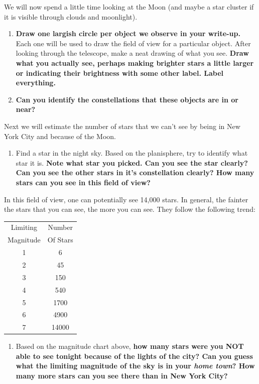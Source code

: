 \documentclass[11pt]{article}
\begin{document}
\medskip \noindent
We will now spend a little time looking at the Moon (and maybe a star cluster if it is visible through clouds and moonlight).  
\begin{enumerate}[resume]
    \item \textbf{Draw one largish circle per object we observe in your write-up.}  Each one will be used to draw the field of view for a particular object. After looking through the telescope, make a neat drawing of what you see. \textbf{Draw what you actually see, perhaps making brighter stars a little larger or indicating their brightness with some other label. Label everything.}
    
    \item \textbf{Can you identify the constellations that these objects are in or near?}
\end{enumerate} 

\medskip \noindent
Next we will estimate the number of stars that we can't see by being in New York City and because of the Moon.  
\begin{enumerate}[resume]
    \item Find a star in the night sky. Based on the planisphere, try to identify what star it is. \textbf{Note what star you picked. Can you see the star clearly? Can you see the other stars in it's constellation clearly? How many stars can you see in this field of view?}
\end{enumerate}

\medskip \noindent
In this field of view, one can potentially see 14,000 stars. In general, the fainter the stars that you can see, the more you can see.  They follow the following trend:

\begin{center}
\begin{tabular}{|c|c|}
\hline
Limiting & Number\\
Magnitude & Of Stars\\
\hline
1 & 6\\
2 & 45\\
3 & 150\\
4 & 540\\
5 & 1700 \\
6 & 4900\\
7 & 14000\\
\hline
\end{tabular}
\end{center}

\noindent
\begin{enumerate}[resume]
    \item Based on the magnitude chart above, \textbf{how many stars were you NOT able to see tonight because of the lights of the city? Can you guess what the limiting magnitude of the sky is in your \emph{home town}?  How many more stars can you see there than in New York City?}
\end{enumerate}
\end{document}
